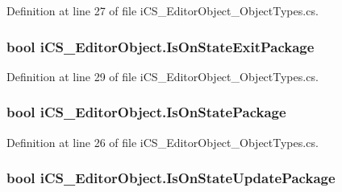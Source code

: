 Definition at line 27 of file i\+C\+S\+\_\+\+Editor\+Object\+\_\+\+Object\+Types.\+cs.

\hypertarget{classi_c_s___editor_object_af718a59ec401ff2e57026db7005916ec}{
\subsubsection[{Is\+On\+State\+Exit\+Package}]{\setlength{\rightskip}{0pt plus 5cm}bool i\+C\+S\+\_\+\+Editor\+Object.\+Is\+On\+State\+Exit\+Package\hspace{0.3cm}{\ttfamily [get]}}}\label{classi_c_s___editor_object_af718a59ec401ff2e57026db7005916ec}


Definition at line 29 of file i\+C\+S\+\_\+\+Editor\+Object\+\_\+\+Object\+Types.\+cs.

\hypertarget{classi_c_s___editor_object_a99e26b5314a282bd1339a0aa4d45e5c5}{
\subsubsection[{Is\+On\+State\+Package}]{\setlength{\rightskip}{0pt plus 5cm}bool i\+C\+S\+\_\+\+Editor\+Object.\+Is\+On\+State\+Package\hspace{0.3cm}{\ttfamily [get]}}}\label{classi_c_s___editor_object_a99e26b5314a282bd1339a0aa4d45e5c5}


Definition at line 26 of file i\+C\+S\+\_\+\+Editor\+Object\+\_\+\+Object\+Types.\+cs.

\hypertarget{classi_c_s___editor_object_ad91e143357b19ef303e4ade32fc6e1fd}{
\subsubsection[{Is\+On\+State\+Update\+Package}]{\setlength{\rightskip}{0pt plus 5cm}bool i\+C\+S\+\_\+\+Editor\+Object.\+Is\+On\+State\+Update\+Package\hspace{0.3cm}{\ttfamily [get]}}}\label{classi_c_s___editor_object_ad91e143357b19ef303e4ade32fc6e1fd}



